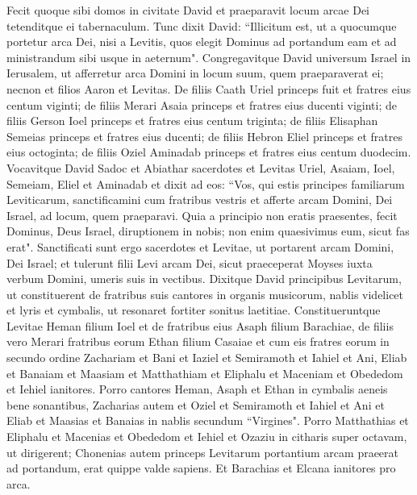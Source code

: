 \begin{biblechapter}  
\verse Fecit quoque sibi domos in civitate David et praeparavit locum arcae Dei tetenditque ei tabernaculum. 
\verse Tunc dixit David: “Illicitum est, ut a quocumque portetur arca Dei, nisi a Levitis, quos elegit Dominus ad portandum eam et ad ministrandum sibi usque in aeternum". 
\verse Congregavitque David universum Israel in Ierusalem, ut afferretur arca Domini in locum suum, quem praeparaverat ei; 
\verse necnon et filios Aaron et Levitas. 
\verse De filiis Caath Uriel princeps fuit et fratres eius centum viginti; 
\verse de filiis Merari Asaia princeps et fratres eius ducenti viginti; 
\verse de filiis Gerson Ioel princeps et fratres eius centum triginta; 
\verse de filiis Elisaphan Semeias princeps et fratres eius ducenti; 
\verse de filiis Hebron Eliel princeps et fratres eius octoginta; 
\verse de filiis Oziel Aminadab princeps et fratres eius centum duodecim. 
\verse Vocavitque David Sadoc et Abiathar sacerdotes et Levitas Uriel, Asaiam, Ioel, Semeiam, Eliel et Aminadab 
\verse et dixit ad eos: “Vos, qui estis principes familiarum Leviticarum, sanctificamini cum fratribus vestris et afferte arcam Domini, Dei Israel, ad locum, quem praeparavi. 
\verse Quia a principio non eratis praesentes, fecit Dominus, Deus Israel, diruptionem in nobis; non enim quaesivimus eum, sicut fas erat". 
\verse Sanctificati sunt ergo sacerdotes et Levitae, ut portarent arcam Domini, Dei Israel; 
\verse et tulerunt filii Levi arcam Dei, sicut praeceperat Moyses iuxta verbum Domini, umeris suis in vectibus. 
\verse Dixitque David principibus Levitarum, ut constituerent de fratribus suis cantores in organis musicorum, nablis videlicet et lyris et cymbalis, ut resonaret fortiter sonitus laetitiae. 
\verse Constitueruntque Levitae Heman filium Ioel et de fratribus eius Asaph filium Barachiae, de filiis vero Merari fratribus eorum Ethan filium Casaiae 
\verse et cum eis fratres eorum in secundo ordine Zachariam et Bani et Iaziel et Semiramoth et Iahiel et Ani, Eliab et Banaiam et Maasiam et Matthathiam et Eliphalu et Maceniam et Obededom et Iehiel ianitores. 
\verse Porro cantores Heman, Asaph et Ethan in cymbalis aeneis bene sonantibus, 
\verse Zacharias autem et Oziel et Semiramoth et Iahiel et Ani et Eliab et Maasias et Banaias in nablis secundum “Virgines". 
\verse Porro Matthathias et Eliphalu et Macenias et Obededom et Iehiel et Ozaziu in citharis super octavam, ut dirigerent; 
\verse Chonenias autem princeps Levitarum portantium arcam praeerat ad portandum, erat quippe valde sapiens. 
\verse Et Barachias et Elcana ianitores pro arca. 

\end{biblechapter}
